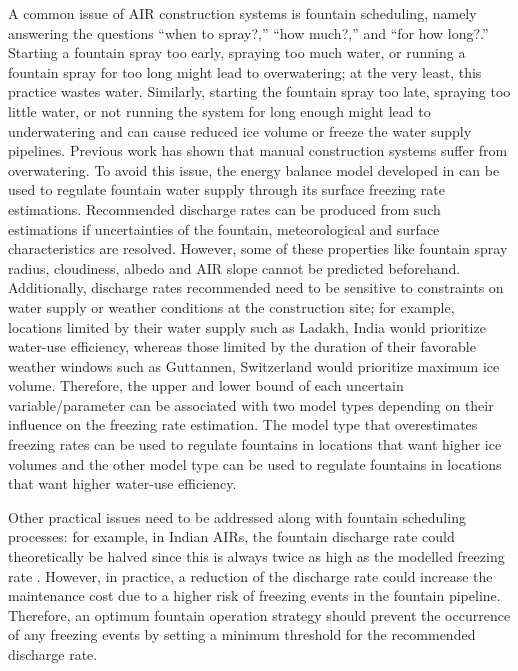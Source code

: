 \documentclass[tc, manuscript]{copernicus}
\begin{document}
A common issue of AIR construction systems is fountain scheduling, namely answering the questions “when to
spray?,” “how much?,” and “for how long?.” Starting a fountain spray too early, spraying too much water, or
running a fountain spray for too long might lead to overwatering; at the very least, this practice wastes water.
Similarly, starting the fountain spray too late, spraying too little water, or not running the system for long
enough might lead to underwatering and can cause reduced ice volume or freeze the water supply pipelines.
Previous work \citep{balasubramanianInfluenceMeteorologicalConditions2022} has shown that manual construction
systems suffer from overwatering. To avoid this issue, the energy balance model developed in
\cite{balasubramanianInfluenceMeteorologicalConditions2022} can be used to regulate fountain water supply
through its surface freezing rate estimations. Recommended discharge rates can be produced from such estimations
if uncertainties of the fountain, meteorological and surface characteristics are resolved. However, some of
these properties like fountain spray radius, cloudiness, albedo and AIR slope cannot be predicted beforehand.
Additionally, discharge rates recommended need to be sensitive to constraints on water supply or weather
conditions at the construction site; for example, locations limited by their water supply such as Ladakh, India
would prioritize water-use efficiency, whereas those limited by the duration of their favorable weather windows
such as Guttannen, Switzerland would prioritize maximum ice volume. Therefore, the upper and lower bound of each
uncertain variable/parameter can be associated with two model types depending on their influence on the freezing
rate estimation. The model type that overestimates freezing rates can be used to regulate fountains in locations
that want higher ice volumes and the other model type can be used to regulate fountains in locations that want
higher water-use efficiency.
    
Other practical issues need to be addressed along with fountain scheduling processes: for example, in Indian
AIRs, the fountain discharge rate could theoretically be halved since this is always twice as high as the
modelled freezing rate \citep{balasubramanianInfluenceMeteorologicalConditions2022}. However, in practice, a
reduction of the discharge rate could increase the maintenance cost due to a higher risk of freezing events in
the fountain pipeline. Therefore, an optimum fountain operation strategy should prevent the occurrence of any
freezing events by setting a minimum threshold for the recommended discharge rate.
\end{document}
